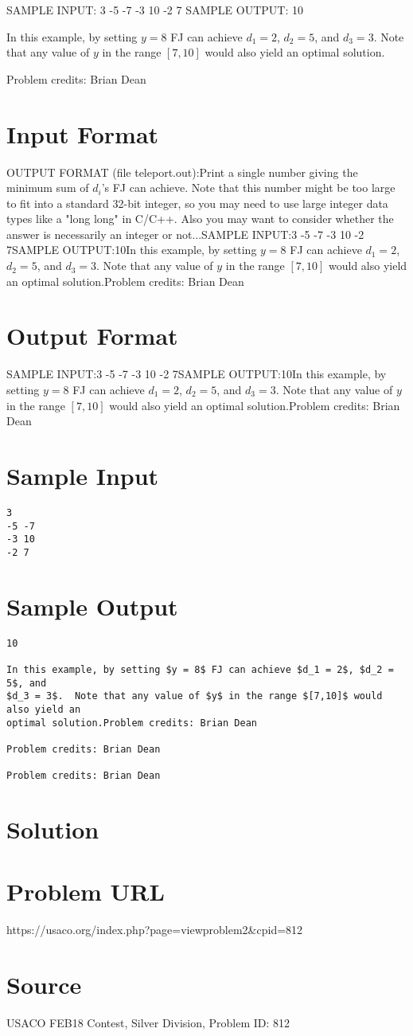 \documentclass[12pt]{article}
\begin{document}
SAMPLE INPUT:
3
-5 -7
-3 10
-2 7
SAMPLE OUTPUT: 
10

In this example, by setting $y = 8$ FJ can achieve $d_1 = 2$, $d_2 = 5$, and
$d_3 = 3$.  Note that any value of $y$ in the range $[7,10]$ would also yield an
optimal solution.


Problem credits: Brian Dean



\section*{Input Format}
OUTPUT FORMAT (file teleport.out):Print a single number giving the minimum sum of $d_i$'s FJ can achieve.  Note
that this number might be too large to fit into a standard 32-bit integer, so
you may need to use large integer data types like a "long long" in C/C++.  Also
you may want to consider whether the answer is necessarily an integer or not...SAMPLE INPUT:3
-5 -7
-3 10
-2 7SAMPLE OUTPUT:10In this example, by setting $y = 8$ FJ can achieve $d_1 = 2$, $d_2 = 5$, and
$d_3 = 3$.  Note that any value of $y$ in the range $[7,10]$ would also yield an
optimal solution.Problem credits: Brian Dean

\section*{Output Format}
SAMPLE INPUT:3
-5 -7
-3 10
-2 7SAMPLE OUTPUT:10In this example, by setting $y = 8$ FJ can achieve $d_1 = 2$, $d_2 = 5$, and
$d_3 = 3$.  Note that any value of $y$ in the range $[7,10]$ would also yield an
optimal solution.Problem credits: Brian Dean

\section*{Sample Input}
\begin{verbatim}
3
-5 -7
-3 10
-2 7
\end{verbatim}

\section*{Sample Output}
\begin{verbatim}
10

In this example, by setting $y = 8$ FJ can achieve $d_1 = 2$, $d_2 = 5$, and
$d_3 = 3$.  Note that any value of $y$ in the range $[7,10]$ would also yield an
optimal solution.Problem credits: Brian Dean

Problem credits: Brian Dean

Problem credits: Brian Dean
\end{verbatim}

\section*{Solution}


\section*{Problem URL}
https://usaco.org/index.php?page=viewproblem2&cpid=812

\section*{Source}
USACO FEB18 Contest, Silver Division, Problem ID: 812
\end{document}
